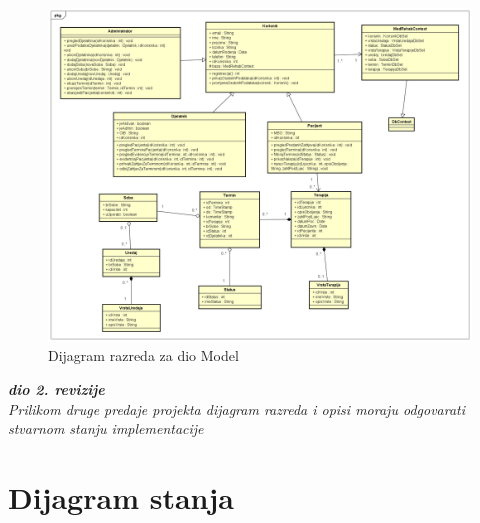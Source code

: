 			\begin{figure}[H]
				\includegraphics[scale=0.3]{slike/Dijagram_razreda_1.PNG} %
				\centering
				\caption{Dijagram razreda za dio Model}
				\label{fig:dijagram_razreda_3}
			\end{figure}
			
			
			
			\textbf{\textit{dio 2. revizije}}\\			
			
			\textit{Prilikom druge predaje projekta dijagram razreda i opisi moraju odgovarati stvarnom stanju implementacije}
			
			
			
			\eject
		
		\section{Dijagram stanja}
			
